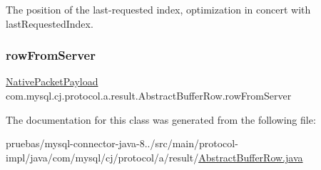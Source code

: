 The position of the last-\/requested index, optimization in concert with last\+Requested\+Index. \mbox{\label{classcom_1_1mysql_1_1cj_1_1protocol_1_1a_1_1result_1_1_abstract_buffer_row_a7cf03826ff7d879810ca7d23472a49f5}} 
\subsubsection{\texorpdfstring{row\+From\+Server}{rowFromServer}}
{\footnotesize\ttfamily \mbox{\hyperlink{classcom_1_1mysql_1_1cj_1_1protocol_1_1a_1_1_native_packet_payload}{Native\+Packet\+Payload}} com.\+mysql.\+cj.\+protocol.\+a.\+result.\+Abstract\+Buffer\+Row.\+row\+From\+Server\hspace{0.3cm}{\ttfamily [protected]}}



The documentation for this class was generated from the following file\+:\begin{DoxyCompactItemize}
\item 
pruebas/mysql-\/connector-\/java-\/8../src/main/protocol-\/impl/java/com/mysql/cj/protocol/a/result/\mbox{\hyperlink{_abstract_buffer_row_8java}{Abstract\+Buffer\+Row.\+java}}\end{DoxyCompactItemize}
